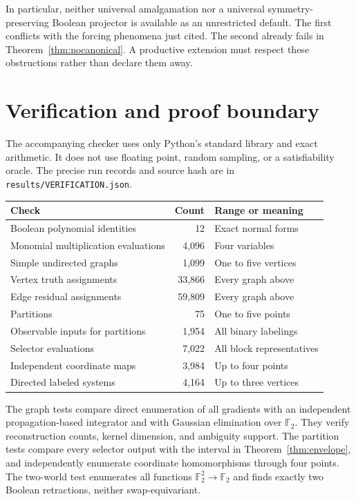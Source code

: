 \documentclass[11pt,letterpaper]{article}
\theoremstyle{definition}
\newcommand{\F}{\mathbb F_2}
\begin{document}
In particular, neither universal amalgamation nor a universal symmetry-preserving Boolean projector is available as an unrestricted default. The first conflicts with the forcing phenomena just cited. The second already fails in Theorem~\ref{thm:nocanonical}. A productive extension must respect these obstructions rather than declare them away.

\section{Verification and proof boundary}\label{sec:verification}
The accompanying checker uses only Python's standard library and exact arithmetic. It does not use floating point, random sampling, or a satisfiability oracle. The precise run records and source hash are in \texttt{results/VERIFICATION.json}.

\begin{center}
\begin{tabular}{p{.45\linewidth}r p{.25\linewidth}}
\toprule
Check & Count & Range or meaning\\
\midrule
Boolean polynomial identities & 12 & Exact normal forms\\
Monomial multiplication evaluations & 4,096 & Four variables\\
Simple undirected graphs & 1,099 & One to five vertices\\
Vertex truth assignments & 33,866 & Every graph above\\
Edge residual assignments & 59,809 & Every graph above\\
Partitions & 75 & One to five points\\
Observable inputs for partitions & 1,954 & All binary labelings\\
Selector evaluations & 7,022 & All block representatives\\
Independent coordinate maps & 3,984 & Up to four points\\
Directed labeled systems & 4,164 & Up to three vertices\\
\bottomrule
\end{tabular}
\end{center}

The graph tests compare direct enumeration of all gradients with an independent propagation-based integrator and with Gaussian elimination over $\F$. They verify reconstruction counts, kernel dimension, and ambiguity support. The partition tests compare every selector output with the interval in Theorem~\ref{thm:envelope}, and independently enumerate coordinate homomorphisms through four points. The two-world test enumerates all functions $\F^2\to\F$ and finds exactly two Boolean retractions, neither swap-equivariant.
\end{document}
